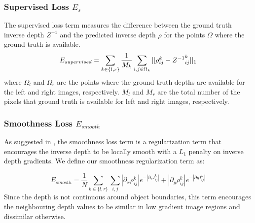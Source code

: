 \documentclass[letterpaper, 10 pt, conference]{ieeeconf}
\begin{document}
\subsubsection{Supervised Loss $E_{s}$}
The supervised loss term measures the difference between the ground truth inverse depth $Z^{-1}$ and the predicted inverse depth $\rho$ for the points $\Omega$ where the ground truth is available. \\
\begin{equation}
E_{supervised}= \sum\limits_{k \in \{l,r\}}\frac{1}{M_{k}}\sum\limits_{i,j \in \Omega_{k}} {||\rho_{ij}^{k}- {Z^{-1}}_{ij}^{k}  ||_{1}} \\
\end{equation}
where $\Omega_{l}$ and $\Omega_{r}$ are the points where the ground truth depths are available for the left and right images, respectively.  $M_{l}$ and $M_{r}$ are the total number of the pixels that ground truth is available for left and right images, respectively.\\

\subsubsection{Smoothness Loss $E_{smooth}$}
As suggested in \cite{godard2017unsupervised, kuznietsov2017semi}, the smoothness loss term is a regularization term that encourages the inverse depth to be locally smooth with a $L_{1}$ penalty on inverse depth gradients. We define our smoothness regularization term as:

 
\begin{equation}
    E_{smooth}= \frac{1}{N}\sum_{k\in \{l,r\}} \sum\limits_{i,j}|\partial_{x}\rho_{ij}^k|e^{-|\partial_{x}I_{ij}^{k}|}+ |\partial_{y}\rho_{ij}^k|e^{-|\partial{y}I_{ij}^{k}|}  
\end{equation}
 Since the depth is not continuous around object boundaries, this term encourages the neighbouring depth values to be similar in low gradient image regions and dissimilar otherwise.
 
\end{document}
